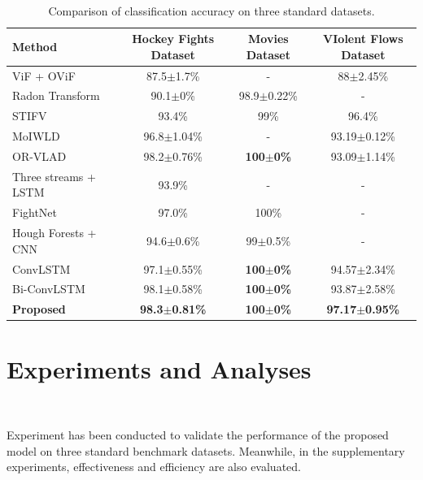 \documentclass[10pt,twocolumn,letterpaper]{article}
\begin{document}

\begin{table}[t]
\begin{center}
\caption{Comparison of classification accuracy on three standard datasets.}
~\label{table:result}
\begin{tabular}{lccc}
\hline
\textbf{Method} & \textbf{Hockey Fights Dataset} & \textbf{Movies Dataset} & \textbf{VIolent Flows Dataset} \\
\hline\hline
ViF + OViF~\cite{ovif} & 87.5$\pm$1.7\% & - & 88$\pm$2.45\% \\
Radon Transform~\cite{fast} & 90.1$\pm$0\% & 98.9$\pm$0.22\% & - \\
STIFV~\cite{bilinski2016human} & 93.4\% & 99\% & 96.4\% \\
MoIWLD~\cite{MoIWLD} & 96.8$\pm$1.04\% & - & 93.19$\pm$0.12\% \\
OR-VLAD~\cite{vlad} & 98.2$\pm$0.76\% & \textbf{100$\pm$0\%} & 93.09$\pm$1.14\% \\
\hline
Three streams + LSTM~\cite{dong2016multi} & 93.9\% & - & - \\
FightNet~\cite{zhou2017violent} & 97.0\% & 100\% & - \\
Hough Forests + CNN~\cite{serrano2018fight} & 94.6$\pm$0.6\% & 99$\pm$0.5\% & - \\
ConvLSTM~\cite{convlstm_sudh} & 97.1$\pm$0.55\% & \textbf{100$\pm$0\%} & 94.57$\pm$2.34\% \\
Bi-ConvLSTM~\cite{bi_convlstm} & 98.1$\pm$0.58\% & \textbf{100$\pm$0\%} & 93.87$\pm$2.58\% \\
\textbf{Proposed} & \textbf{98.3$\pm$0.81\%} & \textbf{100$\pm$0\%} & \textbf{97.17$\pm$0.95\%} \\
\hline
\end{tabular}
\end{center}
\end{table}


\section{Experiments and Analyses}
~\label{sec:4}

Experiment has been conducted to validate the performance of the proposed model on three standard benchmark datasets.
Meanwhile, in the supplementary experiments, effectiveness and efficiency are also evaluated.
\end{document}
